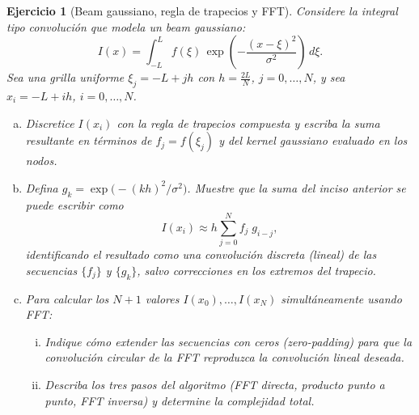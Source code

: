 \documentclass[12pt]{article}
\newtheorem{exercise}{Ejercicio}
\begin{document}

\begin{exercise}[Beam gaussiano, regla de trapecios y FFT]
Considere la integral tipo convolución que modela un \emph{beam gaussiano}:
\[
I(x)=\int_{-L}^{L} f(\xi)\, \exp\!\left(-\frac{(x-\xi)^2}{\sigma^2}\right)\, d\xi.
\]
Sea una grilla uniforme $\xi_j=-L+jh$ con $h=\frac{2L}{N}$, $j=0,\ldots,N$, y sea $x_i=-L+ih$, $i=0,\ldots,N$.
\begin{enumerate}[(a)]
\item Discretice $I(x_i)$ con la regla de trapecios compuesta y escriba la suma resultante en términos de $f_j = f(\xi_j)$ y del kernel gaussiano evaluado en los nodos.
\item Defina $g_k = \exp\!\bigl(-{(kh)^2}/{\sigma^2}\bigr)$. Muestre que la suma del inciso anterior se puede escribir como
\[
I(x_i) \approx h \sum_{j=0}^{N} f_j \; g_{i-j},
\]
identificando el resultado como una convolución discreta (lineal) de las secuencias $\{f_j\}$ y $\{g_k\}$, salvo correcciones en los extremos del trapecio.

\item Para calcular los $N+1$ valores $I(x_0), \ldots, I(x_N)$ simultáneamente usando FFT:
\begin{enumerate}[i.]
\item Indique cómo extender las secuencias con ceros (\emph{zero-padding}) para que la convolución circular de la FFT reproduzca la convolución lineal deseada.
\item Describa los tres pasos del algoritmo (FFT directa, producto punto a punto, FFT inversa) y determine la complejidad total.
\end{enumerate}
\end{enumerate}
\end{exercise}

\end{document}
